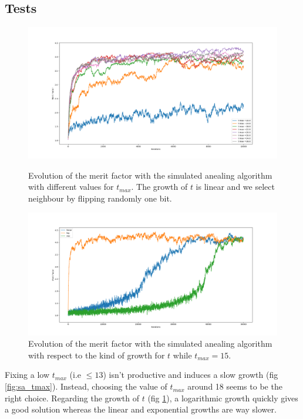 \documentclass[a4paper,11pt,openany]{article}
\begin{document}
\subsection{Tests}
\begin{figure}[H]
\centering
\begin{minipage}{.45\textwidth}
  \begin{center}
  \includegraphics[scale=0.23]{Images/sa_tmax}
  \caption{Evolution of the merit factor with the simulated anealing algorithm with different values for $t_{max}$. The growth of $t$ is linear and we select neighbour by flipping randomly one bit.}
  \label{fig:sa_tmax}
  \end{center}
\end{minipage}%
\hfill
\begin{minipage}{.5\textwidth}
  \begin{center}
  \includegraphics[scale=0.23]{Images/sa_growth}
  \caption{Evolution of the merit factor with the simulated anealing algorithm with respect to the kind of growth for $t$ while $t_{max}=15$.}
  \label{fig:sa_growth}
  \end{center}
\end{minipage}
\end{figure}
\noindent
Fixing a low $t_{max}$ (i.e $\leq 13$) isn't productive and induces a slow growth (fig \ref{fig:sa_tmax}). Instead, choosing the value of $t_{max}$ around 18 seems to be the right choice. Regarding the growth of $t$ (fig \ref{fig:sa_growth}), a logarithmic growth quickly gives a good solution whereas the linear and exponential growths are way slower.
\end{document}
